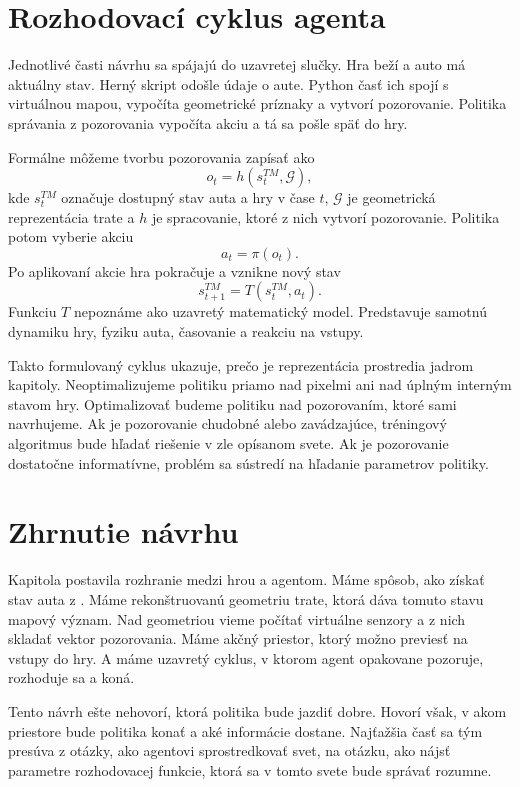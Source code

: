 \section{Rozhodovací cyklus agenta}

Jednotlivé časti návrhu sa spájajú do uzavretej slučky. Hra beží a auto má aktuálny stav. Herný skript odošle údaje o aute. Python časť ich spojí s virtuálnou mapou, vypočíta geometrické príznaky a vytvorí pozorovanie. Politika správania z pozorovania vypočíta akciu a tá sa pošle späť do hry.

Formálne môžeme tvorbu pozorovania zapísať ako
\[
    o_t = h(s_t^{TM}, \mathcal{G}),
\]
kde \(s_t^{TM}\) označuje dostupný stav auta a hry v čase \(t\), \(\mathcal{G}\) je geometrická reprezentácia trate a \(h\) je spracovanie, ktoré z nich vytvorí pozorovanie. Politika potom vyberie akciu
\[
    a_t = \pi(o_t).
\]
Po aplikovaní akcie hra pokračuje a vznikne nový stav
\[
    s_{t+1}^{TM} = T(s_t^{TM}, a_t).
\]
Funkciu \(T\) nepoznáme ako uzavretý matematický model. Predstavuje samotnú dynamiku hry, fyziku auta, časovanie a reakciu na vstupy.

Takto formulovaný cyklus ukazuje, prečo je reprezentácia prostredia jadrom kapitoly. Neoptimalizujeme politiku priamo nad pixelmi ani nad úplným interným stavom hry. Optimalizovať budeme politiku nad pozorovaním, ktoré sami navrhujeme. Ak je pozorovanie chudobné alebo zavádzajúce, tréningový algoritmus bude hľadať riešenie v zle opísanom svete. Ak je pozorovanie dostatočne informatívne, problém sa sústredí na hľadanie parametrov politiky.


\section{Zhrnutie návrhu}

Kapitola postavila rozhranie medzi hrou a agentom. Máme spôsob, ako získať stav auta z \Trackmania{}. Máme rekonštruovanú geometriu trate, ktorá dáva tomuto stavu mapový význam. Nad geometriou vieme počítať virtuálne senzory a z nich skladať vektor pozorovania. Máme akčný priestor, ktorý možno previesť na vstupy do hry. A máme uzavretý cyklus, v ktorom agent opakovane pozoruje, rozhoduje sa a koná.

Tento návrh ešte nehovorí, ktorá politika bude jazdiť dobre. Hovorí však, v akom priestore bude politika konať a aké informácie dostane. Najťažšia časť sa tým presúva z otázky, ako agentovi sprostredkovať svet, na otázku, ako nájsť parametre rozhodovacej funkcie, ktorá sa v tomto svete bude správať rozumne.
